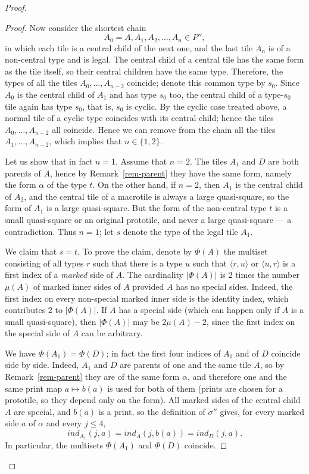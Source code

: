 \documentclass[10pt,a4paper]{amsart}
\newcommand{\ind}{\textit{ind}}
\newcommand{\marked}{\mu}
\newcommand{\pair}[1]{\langle #1\rangle}
\begin{document}
\begin{proof}
\begin{proof}
Now consider the shortest chain
$$
A_0=A,A_1,A_2,\dots,A_n\in P'',
$$
in which each tile is a central child of the next one, and the last tile $A_n$
is of a non-central type and is legal. 
The central child of a central tile has the same form as the tile itself, so their central children
have the same type. Therefore, the types of all the tiles $A_0,\dots,A_{n-2}$ coincide; denote this common type by $s_0$.
Since $A_0$ is the central child of $A_1$ and has type $s_0$ too, the central child of a type-$s_0$ tile again has type $s_0$,
that is, $s_0$ is cyclic. By the cyclic case treated above, a normal tile of a cyclic type coincides with its central child;
hence the tiles $A_0,\dots,A_{n-2}$ all coincide.
Hence we can remove from the chain all the tiles $A_1,\dots,A_{n-2}$, which implies that
$n\in\{1,2\}$.

Let us show that in fact $n=1$. Assume that $n=2$. The tiles $A_1$ and $D$ are both parents
of $A$, hence by Remark~\ref{rem-parent} they have the same form, namely the form $\alpha$ of the
type $t$. On the other hand, if $n=2$, then $A_1$ is the central child of $A_2$, and the central
tile of a macrotile is always a large quasi-square, so the form of $A_1$ is a large quasi-square.
But the form of the non-central type $t$ is a small quasi-square or an original prototile, and
never a large quasi-square --- a contradiction. Thus $n=1$; let $s$ denote the type of the legal
tile $A_1$.

We claim that  $s=t$. To prove the claim, 
denote by $\Phi(A)$ the multiset consisting of all types $r$ such that 
there is a type $u$ such that  $\pair{r,u}$ or $\pair{u,r}$ is a first index of a \emph{marked} side of $A$.
The cardinality $|\Phi(A)|$ is 2 times the number $\marked(A)$ of marked inner sides of $A$ provided
$A$ has no special sides. Indeed, the first index on every non-special marked inner side is the identity
index, which contributes 2 to $|\Phi(A)|$. If $A$ has a special side (which can happen only if $A$ is a small quasi-square),
then $|\Phi(A)|$ may be $2\marked(A)-2$, since the first index on the special side of $A$ can be arbitrary.

We have  $\Phi(A_1)=\Phi(D)$; in fact the first four indices of $A_1$ and of $D$ coincide side by
side. Indeed, $A_1$ and $D$ are parents of one and the same tile $A$, so by
Remark~\ref{rem-parent} they are of the same form $\alpha$, and therefore one and the same print
map $a\mapsto b(a)$ is used for both of them (prints are chosen for a prototile, so they depend
only on the form). All marked sides of the central child $A$ are special, and $b(a)$ is a print, so
the definition of $\sigma''$ gives, for every marked side $a$ of $\alpha$ and every $j\le4$,
$$
\ind_{A_1}(j,a)=\ind_A(j,b(a))=\ind_D(j,a).
$$
In particular, the multisets $\Phi(A_1)$ and $\Phi(D)$ coincide.


\end{proof}
\end{proof}
\end{document}
